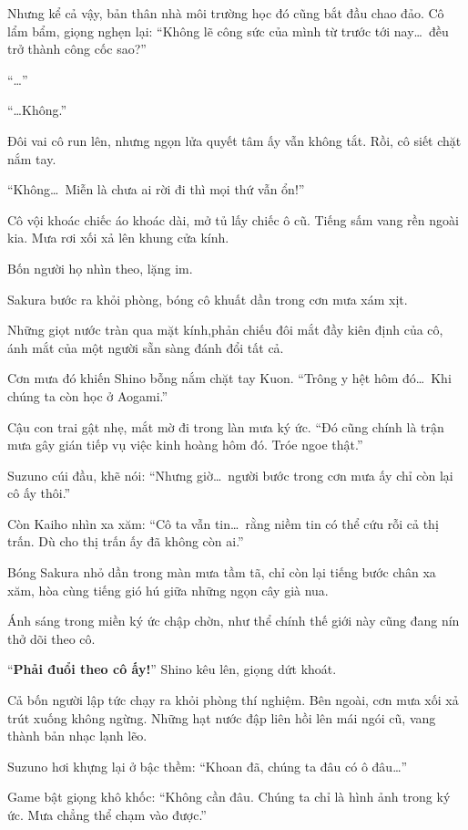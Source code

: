 \documentclass[../main.tex]{subfiles}
\begin{document}
Nhưng kể cả vậy, bản thân nhà môi trường học đó cũng bắt đầu chao đảo.
Cô lẩm bẩm, giọng nghẹn lại: ``Không lẽ công sức của mình từ trước tới nay\dots\ đều trở thành công cốc sao?''

``\dots''

``\dots Không.''

Đôi vai cô run lên, nhưng ngọn lửa quyết tâm ấy vẫn không tắt. Rồi, cô siết chặt nắm tay.

``Không\dots\ Miễn là chưa ai rời đi thì mọi thứ vẫn ổn!''

Cô vội khoác chiếc áo khoác dài, mở tủ lấy chiếc ô cũ. Tiếng sấm vang rền ngoài kia. Mưa rơi xối xả lên khung cửa kính.

Bốn người họ nhìn theo, lặng im.

Sakura bước ra khỏi phòng, bóng cô khuất dần trong cơn mưa xám xịt.

Những giọt nước tràn qua mặt kính,phản chiếu đôi mắt đầy kiên định của cô, ánh mắt của một người sẵn sàng đánh đổi tất cả.

Cơn mưa đó khiến Shino bỗng nắm chặt tay Kuon. ``Trông y hệt hôm đó\dots\ Khi chúng ta còn học ở Aogami.''

Cậu con trai gật nhẹ, mắt mờ đi trong làn mưa ký ức. ``Đó cũng chính là trận mưa gây gián tiếp vụ việc kinh hoàng hôm đó. Tróe ngoe thật.''

Suzuno cúi đầu, khẽ nói: ``Nhưng giờ\dots\ người bước trong cơn mưa ấy chỉ còn lại cô ấy thôi.''

Còn Kaiho nhìn xa xăm: ``Cô ta vẫn tin\dots\ rằng niềm tin có thể cứu rỗi cả thị trấn. Dù cho thị trấn ấy đã không còn ai.''

Bóng Sakura nhỏ dần trong màn mưa tầm tã, chỉ còn lại tiếng bước chân xa xăm, hòa cùng tiếng gió hú giữa những ngọn cây già nua.

Ánh sáng trong miền ký ức chập chờn, như thể chính thế giới này cũng đang nín thở dõi theo cô.

``\textbf{Phải đuổi theo cô ấy!}'' Shino kêu lên, giọng dứt khoát.

Cả bốn người lập tức chạy ra khỏi phòng thí nghiệm. Bên ngoài, cơn mưa xối xả trút xuống không ngừng. Những hạt nước đập liên hồi lên mái ngói cũ, vang thành bản nhạc lạnh lẽo.

Suzuno hơi khựng lại ở bậc thềm: ``Khoan đã, chúng ta đâu có ô đâu\dots''

Game bật giọng khô khốc: ``Không cần đâu. Chúng ta chỉ là hình ảnh trong ký ức. Mưa chẳng thể chạm vào được.''
\end{document}
